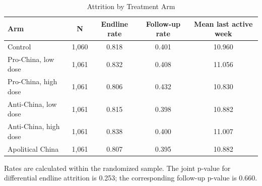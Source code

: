 \begin{table}[H]
\centering
\caption{Attrition by Treatment Arm}
\label{tab:attrition}
\footnotesize
\begin{threeparttable}
\begin{tabular}{lcccc}
\toprule
Arm & N & Endline rate & Follow-up rate & Mean last active week \\
\midrule
Control & 1,060 & 0.818 & 0.401 & 10.960 \\
Pro-China, low dose & 1,061 & 0.832 & 0.408 & 11.056 \\
Pro-China, high dose & 1,061 & 0.806 & 0.432 & 10.830 \\
Anti-China, low dose & 1,061 & 0.815 & 0.398 & 10.882 \\
Anti-China, high dose & 1,061 & 0.838 & 0.400 & 11.007 \\
Apolitical China & 1,061 & 0.807 & 0.395 & 10.882 \\
\bottomrule
\end{tabular}
\begin{tablenotes}[flushleft]
\footnotesize
\item Rates are calculated within the randomized sample. The joint p-value for differential endline attrition is 0.253; the corresponding follow-up p-value is 0.660.
\end{tablenotes}
\end{threeparttable}
\end{table}
